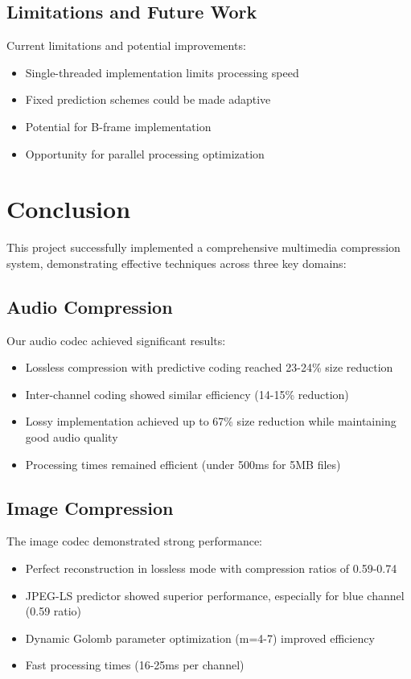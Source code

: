 \documentclass[a4paper,14pt]{article}
\begin{document}
\subsection{Limitations and Future Work}
Current limitations and potential improvements:
\begin{itemize}
    \item Single-threaded implementation limits processing speed
    \item Fixed prediction schemes could be made adaptive
    \item Potential for B-frame implementation
    \item Opportunity for parallel processing optimization
\end{itemize}

\section{Conclusion}
This project successfully implemented a comprehensive multimedia compression system, demonstrating effective techniques across three key domains:

\subsection{Audio Compression}
Our audio codec achieved significant results:
\begin{itemize}
    \item Lossless compression with predictive coding reached 23-24\% size reduction
    \item Inter-channel coding showed similar efficiency (14-15\% reduction)
    \item Lossy implementation achieved up to 67\% size reduction while maintaining good audio quality
    \item Processing times remained efficient (under 500ms for 5MB files)
\end{itemize}

\subsection{Image Compression}
The image codec demonstrated strong performance:
\begin{itemize}
    \item Perfect reconstruction in lossless mode with compression ratios of 0.59-0.74
    \item JPEG-LS predictor showed superior performance, especially for blue channel (0.59 ratio)
    \item Dynamic Golomb parameter optimization (m=4-7) improved efficiency
    \item Fast processing times (16-25ms per channel)
\end{itemize}
\end{document}
